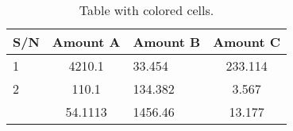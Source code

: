 \documentclass{article}
\begin{document}
	
	\begin{table}[h!]
		\begin{center}
			\caption{Table with colored cells.}
			\label{tab:table1}
			\begin{tabular}{l|S|s|c} %
		    \hline
		    \textbf{S/N} & \textbf{Amount A} & \textbf{Amount B} & \textbf{Amount C}\\
		    \hline
		    1 & 4210.1 & 33.454 & 233.114\\
		    2 & 110.1 & 134.382 & 3.567\\
		     & 54.1113 & 1456.46 & 13.177\\
		    \hline
        \end{tabular}
    \end{center}
\end{table}
\end{document}
